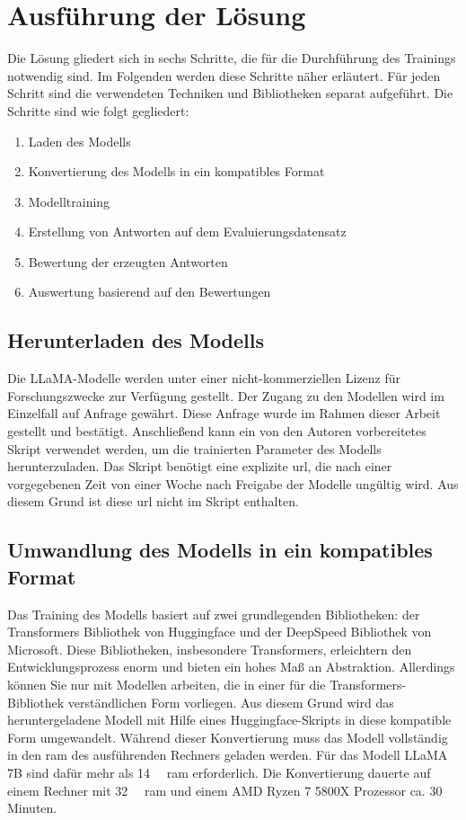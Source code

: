 \chapter{Ausführung der Lösung}\label{ch:solution}

Die Lösung gliedert sich in sechs Schritte, die für die Durchführung des Trainings notwendig sind.
Im Folgenden werden diese Schritte näher erläutert. Für jeden Schritt sind die verwendeten Techniken und Bibliotheken separat aufgeführt.
Die Schritte sind wie folgt gegliedert:
\begin{enumerate}
    \item Laden des Modells
    \item Konvertierung des Modells in ein kompatibles Format
    \item Modelltraining
    \item Erstellung von Antworten auf dem Evaluierungsdatensatz
    \item Bewertung der erzeugten Antworten
    \item Auswertung basierend auf den Bewertungen
\end{enumerate}

\section{Herunterladen des Modells}
Die LLaMA-Modelle werden unter einer nicht-kommerziellen Lizenz für Forschungszwecke zur Verfügung gestellt. Der Zugang zu den Modellen wird im Einzelfall auf Anfrage gewährt. Diese Anfrage wurde im Rahmen dieser Arbeit gestellt und bestätigt.
Anschließend kann ein von den Autoren vorbereitetes Skript verwendet werden, um die trainierten Parameter des Modells herunterzuladen.
Das Skript benötigt eine explizite \ac{url}, die nach einer vorgegebenen Zeit von einer Woche nach Freigabe der Modelle ungültig wird. Aus diesem Grund ist diese \ac{url} nicht im Skript enthalten.

\section{Umwandlung des Modells in ein kompatibles Format}
Das Training des Modells basiert auf zwei grundlegenden Bibliotheken: der Transformers Bibliothek von Huggingface und der DeepSpeed Bibliothek von Microsoft.
Diese Bibliotheken, insbesondere Transformers, erleichtern den Entwicklungsprozess enorm und bieten ein hohes Maß an Abstraktion. Allerdings können Sie nur mit Modellen arbeiten, die in einer für die Transformers-Bibliothek verständlichen Form vorliegen.
Aus diesem Grund wird das heruntergeladene Modell mit Hilfe eines Huggingface-Skripts in diese kompatible Form umgewandelt.
Während dieser Konvertierung muss das Modell vollständig in den \ac{ram} des ausführenden Rechners geladen werden. Für das Modell LLaMA 7B sind dafür mehr als \SI{14}{\giga\byte} \ac{ram} erforderlich.
Die Konvertierung dauerte auf einem Rechner mit \SI{32}{\giga\byte} \ac{ram} und einem AMD Ryzen 7 5800X Prozessor ca. 30 Minuten.

